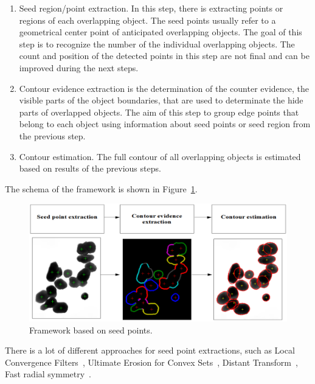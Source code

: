 \documentclass{lutmscthesis}[2010/09/22]
\begin{document}
\begin{enumerate}
\item Seed region/point extraction. In this step, there is extracting points or regions of each overlapping object. The seed points usually refer to a geometrical center point of anticipated overlapping objects. The goal of this step is to recognize the number of the individual overlapping objects. The count and position of the detected points in this step are not final and can be improved during the next steps.
\item Contour evidence extraction is the determination of the counter evidence, the visible parts of the object boundaries, that are used to determinate the hide parts of overlapped objects. The aim of this step to group edge points that belong to each object using information about seed points or seed region from the previous step.
\item Contour estimation. The full contour of all overlapping objects is estimated based on results of the previous steps.
\end{enumerate}


The schema of the framework is shown in Figure~\ref{fig:general_framework}.

\begin{figure}[ht]
  \includegraphics[width=\linewidth]{General_framework.png}
  \caption{Framework based on seed points.~\cite{zafari-thesis}}
  \label{fig:general_framework}
\end{figure}

There is a lot of different approaches for seed point extractions, such as Local Convergence Filters~\cite{LCF}, Ultimate Erosion for Convex Sets~\cite{UECS}, Distant Transform~\cite{DT}, Fast radial symmetry~\cite{BE-FRS}.
\end{document}
